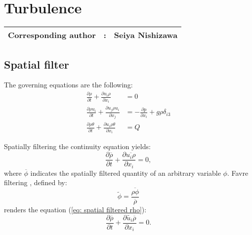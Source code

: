 %

\section{Turbulence}
{\bf \Large
\begin{tabular}{ccc}
\hline
  Corresponding author & : & Seiya Nishizawa\\
\hline
\end{tabular}
}

\def\half{\frac{1}{2}}

\subsection{Spatial filter}

The governing equations are the following:
\begin{align}
  \frac{\partial\rho}{\partial t} + \frac{\partial u_i \rho}{\partial x_i}
  &= 0 \\
  \frac{\partial\rho u_i}{\partial t}
  + \frac{\partial u_j \rho u_i}{\partial x_j}
  &= -\frac{\partial p}{\partial x_i} + g \rho \delta_{i3} \\
  \frac{\partial\rho \theta}{\partial t}
  + \frac{\partial u_i \rho \theta}{\partial x_i}
  &= Q
\end{align}

Spatially filtering the continuity equation yields:
\begin{equation}
  \frac{\partial \overline{\rho}}{\partial t} + \frac{\partial \overline{u_i \rho}}{\partial x_i} = 0, \label{eq: spatial filtered rho}
\end{equation}
where $\overline{\phi}$ indicates the spatially filtered quantity of an arbitrary variable $\phi$.
Favre filtering \citep{Favre_1983}, defined by:
\begin{equation}
  \widetilde{\phi} = \frac{\overline{\rho \phi}}{\overline{\rho}}
\end{equation}
renders the equation (\ref{eq: spatial filtered rho}):
\begin{equation}
  \frac{\partial \overline{\rho}}{\partial t} + \frac{\partial \widetilde{u_i}\overline{\rho}}{\partial x_i} = 0.
\end{equation}


